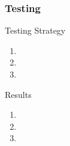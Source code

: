 \begin{frame}
	\centering
	\frametitle{Testing}

	\begin{block}{Testing Strategy}
		\begin{enumerate}
			\item 
			\item 
			\item 
		\end{enumerate}
	\end{block}
	
	\pause
	
	\begin{block}{Results}
		\begin{enumerate}
			\item 
			\item 
			\item 
		\end{enumerate}		
	\end{block}	
	
\end{frame}